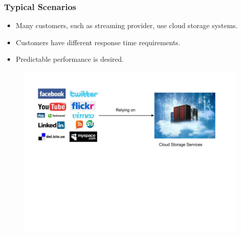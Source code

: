 \documentclass{beamer}
\newcommand{\myv}{\vspace{3 mm}}
\begin{document}
\begin{frame}
  \frametitle{Typical Scenarios}
  \vspace{5 mm}
  \begin{itemize}

  \item Many customers, such as streaming provider, use cloud storage systems.
    \myv
  \item Customers have different response time requirements.
    \myv
  \item Predictable performance is desired.
  \end{itemize}
  \begin{figure}
    \includegraphics[scale=0.30]{img/A_Cloud_Example.png}
  \end{figure}
\end{frame}
\end{document}
